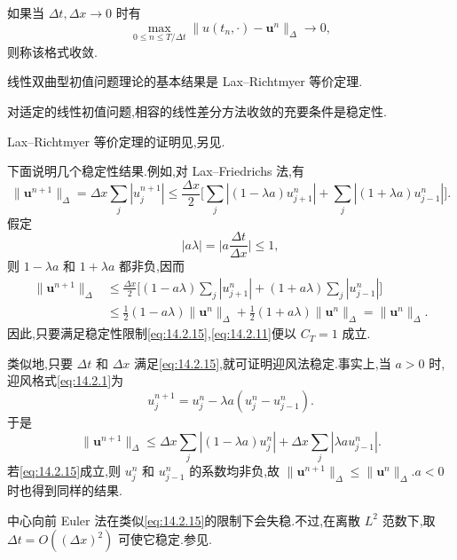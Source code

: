\begin{definition*}
如果当 \(\Delta t,\Delta x\to0\) 时有
\[
  \max_{0\le n\le T/\Delta t}\|u(t_n,\cdot)-\boldsymbol{u}^n\|_\Delta\to0,
\]
则称该格式{\heiti 收敛}.
\end{definition*}

线性双曲型初值问题理论的基本结果是 Lax--Richtmyer 等价定理.
\begin{theorem*}
对适定的线性初值问题,相容的线性差分方法收敛的充要条件是稳定性.
\end{theorem*}
Lax--Richtmyer 等价定理的证明见,另见.

下面说明几个稳定性结果.例如,对 Lax--Friedrichs 法,有
\[
  \|\boldsymbol{u}^{n+1}\|_\Delta=\Delta x\sum_j|u_j^{n+1}|
     \le\frac{\Delta x}{2}
       \biggl[\sum_j|(1-\lambda a)u_{j+1}^n|
                     +\sum_j|(1+\lambda a)u_{j-1}^n|\biggr].
\]
假定
\begin{equation}\label{eq:14.2.15}
  |a\lambda|=\biggl|a\frac{\Delta t}{\Delta x}\biggr|\le1,
\end{equation}
则 \(1-\lambda a\) 和 \(1+\lambda a\) 都非负,因而
\[
  \begin{aligned}
    \|\boldsymbol{u}^{n+1}\|_\Delta
       &\le\frac{\Delta x}{2}\biggl[(1-a\lambda)\sum_j|u_{j+1}^n|
                        +(1+a\lambda)\sum_j|u_{j-1}^n|\biggr]\\
       &\le\tfrac12(1-a\lambda)\|\boldsymbol{u}^n\|_\Delta
             +\tfrac12(1+a\lambda)\|\boldsymbol{u}^n\|_\Delta=\|\boldsymbol{u}^n\|_\Delta.
  \end{aligned}
\]
因此,只要满足稳定性限制\eqref{eq:14.2.15},\eqref{eq:14.2.11}便以 \(C_T=1\) 成立.

类似地,只要 \(\Delta t\) 和 \(\Delta x\) 满足\eqref{eq:14.2.15},就可证明迎风法稳定.事实上,当 \(a>0\) 时,迎风格式\eqref{eq:14.2.1}为
\[
  u_j^{n+1}=u_j^n-\lambda a(u_j^n-u_{j-1}^n).
\]
于是
\[
  \|\boldsymbol{u}^{n+1}\|_\Delta\le\Delta x\sum_j|(1-\lambda a)u_j^n|
                            +\Delta x\sum_j|\lambda a u_{j-1}^n|.
\]
若\eqref{eq:14.2.15}成立,则 \(u_j^n\) 和 \(u_{j-1}^n\) 的系数均非负,故 \(\|\boldsymbol{u}^{n+1}\|_\Delta\le\|\boldsymbol{u}^n\|_\Delta\).\(a<0\) 时也得到同样的结果.

中心向前 Euler 法在类似\eqref{eq:14.2.15}的限制下会失稳.不过,在离散 \(L^2\) 范数下,取 \(\Delta t=O((\Delta x)^2)\) 可使它稳定.参见.

